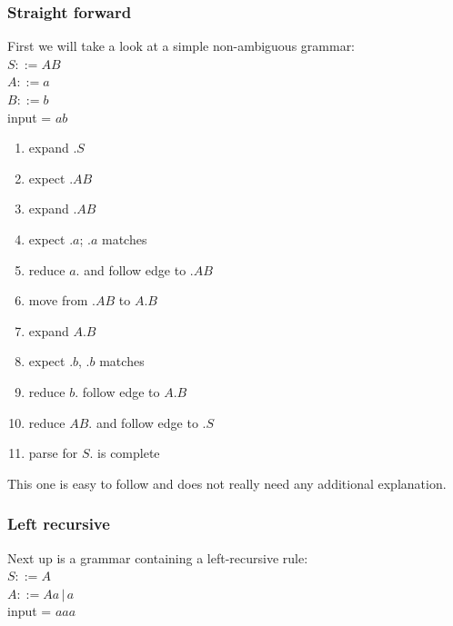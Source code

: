 \documentclass[a4paper,10pt]{article}
\begin{document}
\pagebreak
\subsubsection{Straight forward}
First we will take a look at a simple non-ambiguous grammar:\\
$S ::= AB$\\
$A ::= a$\\
$B ::= b$\\
input = $ab$

\begin{enumerate}
 \setlength{\itemsep}{0pt}
 \setlength{\parskip}{0pt}
 \setlength{\parsep}{0pt}
 
 \item expand $.S$
 \item expect $.AB$
 \item expand $.AB$
 \item expect $.a$; $.a$ matches
 \item reduce $a.$ and follow edge to $.AB$
 \item move from $.AB$ to $A.B$
 \item expand $A.B$
 \item expect $.b$, $.b$ matches
 \item reduce $b.$ follow edge to $A.B$
 \item reduce $AB.$ and follow edge to $.S$
 \item parse for $S.$ is complete 
\end{enumerate}
This one is easy to follow and does not really need any additional explanation.

\subsubsection{Left recursive}
\label{sec:tracesLeftRecusive}
Next up is a grammar containing a left-recursive rule:\\
$S ::= A$\\
$A ::= Aa\,|\,a$\\
input = $aaa$
\end{document}
